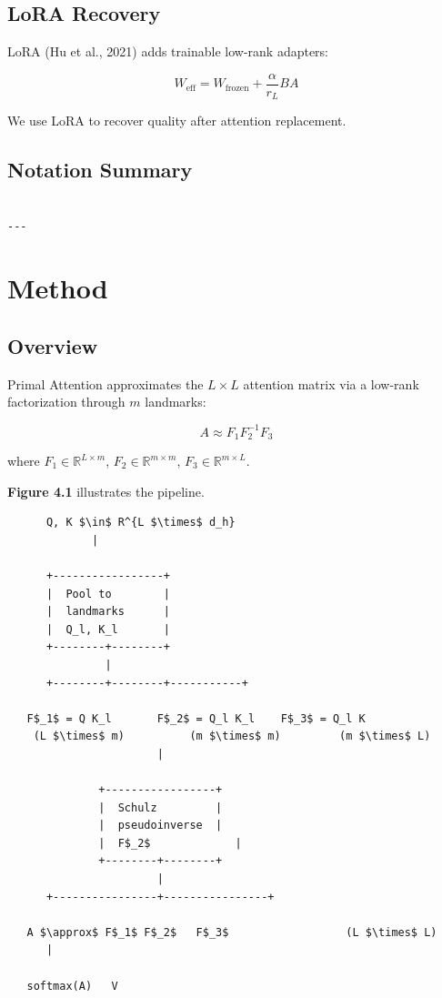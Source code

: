 \subsection{LoRA Recovery}

LoRA (Hu et al., 2021) adds trainable low-rank adapters:

\[
W_\text{eff} = W_\text{frozen} + \frac{\alpha}{r_L} B A
\]

We use LoRA to recover quality after attention replacement.

\subsection{Notation Summary}

\begin{lstlisting}

---
\end{lstlisting}


\section{Method}

\subsection{Overview}

Primal Attention approximates the $L \times L$ attention matrix via a 
low-rank factorization through $m$ landmarks:

\[
A \approx F_1 F_2^{-1} F_3
\]

where $F_1 \in \mathbb{R}^{L \times m}$, $F_2 \in \mathbb{R}^{m \times m}$, 
$F_3 \in \mathbb{R}^{m \times L}$.

\textbf{Figure 4.1} illustrates the pipeline.

\begin{lstlisting}
      Q, K $\in$ R^{L $\times$ d_h}
             |
              
      +-----------------+
      |  Pool to        |
      |  landmarks      |
      |  Q_l, K_l       |
      +--------+--------+
               |
      +--------+--------+-----------+
                                     
   F$_1$ = Q K_l       F$_2$ = Q_l K_l    F$_3$ = Q_l K 
    (L $\times$ m)          (m $\times$ m)         (m $\times$ L)
                       |
                        
              +-----------------+
              |  Schulz         |
              |  pseudoinverse  |
              |  F$_2$             |
              +--------+--------+
                       |
      +----------------+----------------+
                                         
   A $\approx$ F$_1$ F$_2$   F$_3$                  (L $\times$ L)
      |
       
   softmax(A)   V
\end{lstlisting}


